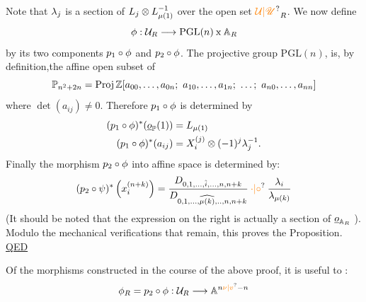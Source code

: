 Note that $\lambda_j$ is a section of $L_j\otimes L_{\mu(1)}^{-1}$ over the open set
$\handwritten{\unsure{\mathcal{U}|\mathscr{U}}}_R$. We now define
\[
\phi:\mathcal{U}_R\longrightarrow\mathrm{PGL}(n)\mathbin{\mathrm{x}}\mathbb{A}_R
\]
by its two components $p_1\circ\phi$ and $p_2\circ\phi$. The projective group
$\mathrm{PGL}(n)$, is, by definition,the affine open subset of
\[
\handwritten{\mathbb{P}}_{n^2+2n}=\operatorname{Proj}\handwritten{\mathbb{Z}}[a_{00},\ldots,a_{0n};\ a_{10},\ldots,a_{1n};\ \ldots;\ a_{n0},\ldots,a_{nn}]
\]
where $\det(a_{ij})\ne 0$. Therefore $p_1\circ\phi$ is determined by
\[
\begin{aligned}
(p_1\circ\phi)^*(\underline{o}_{\mathbb{P}}(1))&=L_{\mu(1)}\\
(p_1\circ\phi)^*(a_{ij})&=X_i^{(j)}\otimes(-1)^j\lambda_j^{-1}.
\end{aligned}
\]
Finally the morphism $p_2\circ\phi$ into affine space is determined by:
\[
(p_2\circ\handwritten{\psi})^*\left(x_i^{(n+k)}\right)=
\frac{D_{0,1,\ldots,\handwritten{\hat{i}},\ldots,n,n+k}}{D_{0,1,\ldots,\handwritten{\widehat{\mu(k)}},..,n,n+k}}\mathbin{\unsure{\cdot|\circ}}
\frac{\handwritten{\lambda}_i}{\handwritten{\lambda}_{\handwritten{\mu}(k)}}
\]
(It should be noted that the expression on the right is actually a
section of $\underline{o}_{\mathbb{A}_R}$ ). Modulo the mechanical verifications that remain,
this proves the Proposition. \quad\uline{QED}

Of the morphisms constructed in the course of the above proof, it
is useful to  :
\[
\handwritten{\phi}_R=p_2\circ\handwritten{\phi}:\handwritten{\mathcal{U}}_R\handwritten{\longrightarrow}\handwritten{\mathbb{A}}^{n\unsure{\nu|v}-n}
\]

